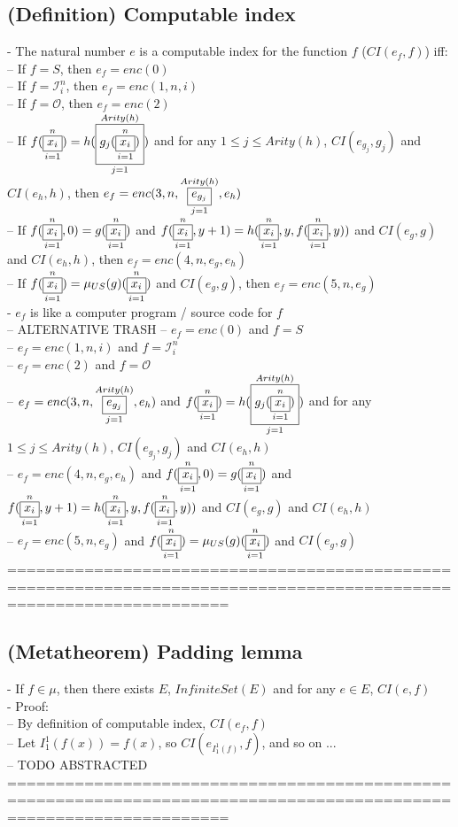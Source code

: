 \documentclass{book}
\newcommand{\vdc}[3]{\underset{#2}{\overset{#3}{\fbox{$#1$}}}}
\begin{document}
\subsection{(Definition) Computable index} %
	- The natural number $e$ is a computable index for the function $f$ ($CI(e_f, f)$) iff: \\
		-- If $f = S$, then $e_f = enc(0)$ \\
		-- If $f = \mathcal{I}_i^n$, then $e_f = enc(1, n, i)$ \\
		-- If $f = \mathcal{O}$, then $e_f = enc(2)$ \\
		-- If $f(\vdc{x_i}{i=1}{n}) = h(\vdc{g_j(\vdc{x_i}{i=1}{n})}{j=1}{Arity(h)})$ and for any $1 \leq j \leq Arity(h)$, $CI(e_{g_j}, g_j)$ and $CI(e_h, h)$, then $e_f = enc(3, n, \vdc{e_{g_j}}{j=1}{Arity(h)}, e_h)$ \\
		-- If $f(\vdc{x_i}{i=1}{n}, 0) = g(\vdc{x_i}{i=1}{n})$ and $f(\vdc{x_i}{i=1}{n}, y+1) = h(\vdc{x_i}{i=1}{n}, y, f(\vdc{x_i}{i=1}{n}, y))$ and $CI(e_g, g)$ and $CI(e_h, h)$, then $e_f = enc(4, n, e_g, e_h)$ \\
		-- If $f(\vdc{x_i}{i=1}{n}) = \mu_{US}(g)(\vdc{x_i}{i=1}{n})$ and $CI(e_g, g)$, then $e_f = enc(5, n, e_g)$ \\
	- $e_f$ is like a computer program / source code for $f$ \\
		-- ALTERNATIVE TRASH
		-- $e_f = enc(0)$ and $f = S$ \\
		-- $e_f = enc(1, n, i)$ and $f = \mathcal{I}_i^n$ \\
		-- $e_f = enc(2)$ and $f = \mathcal{O}$ \\
		-- $e_f = enc(3, n, \vdc{e_{g_j}}{j=1}{Arity(h)}, e_h)$ and $f(\vdc{x_i}{i=1}{n}) = h(\vdc{g_j(\vdc{x_i}{i=1}{n})}{j=1}{Arity(h)})$ and for any $1 \leq j \leq Arity(h)$, $CI(e_{g_j}, g_j)$ and $CI(e_h, h)$ \\
		-- $e_f = enc(4, n, e_g, e_h)$ and $f(\vdc{x_i}{i=1}{n}, 0) = g(\vdc{x_i}{i=1}{n})$ and $f(\vdc{x_i}{i=1}{n}, y+1) = h(\vdc{x_i}{i=1}{n}, y, f(\vdc{x_i}{i=1}{n}, y))$ and $CI(e_g, g)$ and $CI(e_h, h)$ \\
		-- $e_f = enc(5, n, e_g)$ and $f(\vdc{x_i}{i=1}{n}) = \mu_{US}(g)(\vdc{x_i}{i=1}{n})$ and $CI(e_g, g)$ \\
	===================================================================================================================
\subsection{(Metatheorem) Padding lemma} %
	- If $f \in \mu$, then there exists $E$, $InfiniteSet(E)$ and for any $e \in E$, $CI(e, f)$ \\
	- Proof: \\
		-- By definition of computable index, $CI(e_f, f)$ \\
		-- Let $I_1^1(f(x)) = f(x)$, so $CI(e_{I_1^1(f)}, f)$, and so on ... \\
		-- TODO ABSTRACTED \\
	===================================================================================================================
\end{document}
